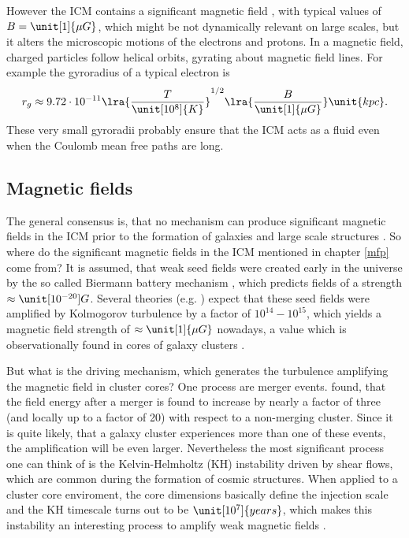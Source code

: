 However the ICM contains a significant magnetic field \citep{Plionis2008}, with
typical values of $B=\unit[1]{\mu G}$, which might be not dynamically relevant
on large scales, but it alters the microscopic motions of the electrons and
protons. In a magnetic field, charged particles follow helical orbits, gyrating
about magnetic field lines. For example the gyroradius of a typical electron is 
\begin{align}
r_g \approx 9.72 \cdot 10^{-11} 
\lra{\frac{T}{\unit[10^8]{K}}}^{1/2} 
\lra{\frac{B}{\unit[1]{\mu G}}} \unit{kpc}. 
\end{align}
These very small gyroradii probably ensure that the ICM acts as a fluid even
when the Coulomb mean free paths are long. 

\subsection{Magnetic fields}
The general consensus is, that no mechanism can produce significant magnetic
fields in the ICM prior to the formation of galaxies and large scale structures
\citep{Kulsrud2008}. So where do the significant magnetic fields in the ICM
mentioned in chapter \ref{mfp} come from? It is assumed, that weak seed fields
were created early in the universe by the so called Biermann battery mechanism
\citep{Biermann1951}, which predicts fields of a strength $\approx
\unit[10^{-20}]{G}$. Several theories (e.g. \citet{Kulsrud1992})
expect that these seed fields were amplified by Kolmogorov turbulence by a
factor of $10^{14}-10^{15}$, which yields a magnetic field strength of 
$\approx \unit[1]{\mu G}$ nowadays, a value which is observationally found in
cores of galaxy clusters \citep{Carilli2002}. 

But what is the driving mechanism, which generates the turbulence amplifying
the magnetic field in cluster cores? One process are merger events. 
\citet{Roettiger1999}
found, that the field energy after a merger is found to increase by nearly a
factor of three (and locally up to a factor of 20) with respect to a non-merging
cluster. Since it is quite likely, that a galaxy cluster experiences more than
one of these events, the amplification will be even larger. Nevertheless the
most significant process one can think of is the Kelvin-Helmholtz (KH)
instability driven by shear flows, which are common during the formation of
cosmic structures. When applied to a cluster core enviroment, the core
dimensions basically define 
the injection scale and the KH timescale turns out to be $\unit[10^7]{years}$,
which makes this instability an interesting process to amplify weak magnetic
fields \citep{Dolag2008}. 

